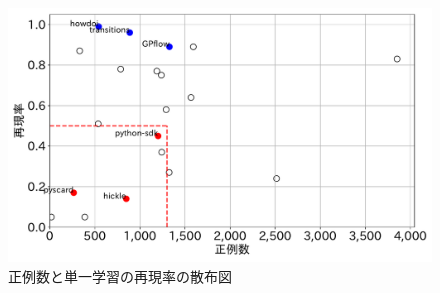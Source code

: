 \documentclass[paper]{ieicej}
\begin{document}





\begin{figure}[t]
	\centering
	\includegraphics[width=1\linewidth]{fig/sannpuzu.pdf}
	\caption{正例数と単一学習の再現率の散布図}
	\label{fig:scatter_plot_filtered}
\end{figure}
\end{document}
